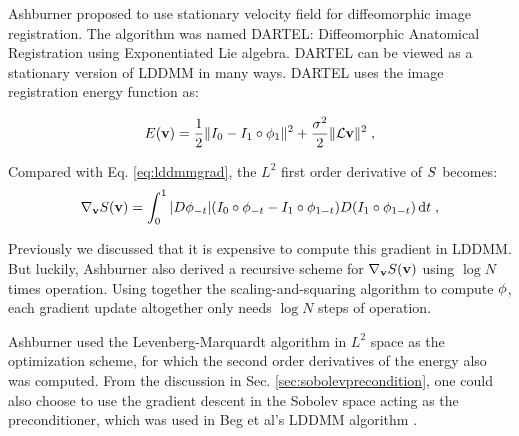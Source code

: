 \documentclass[letterpaper,12pt]{article}
\begin{document}
Ashburner proposed to use stationary velocity field for diffeomorphic image registration. The algorithm was named DARTEL: Diffeomorphic Anatomical Registration using Exponentiated Lie algebra. DARTEL can be viewed as a stationary version of LDDMM in many ways. DARTEL uses the image registration energy  function as:

\begin{align}
E(\mathbf{v}) = \frac{1}{2} \| I_0 - I_1 \circ \phi_{1} \|^2 
+ 
\frac{\sigma^2}{2} \| \mathcal{L} \mathbf{v}\|^2  \;,
\label{eq:dartel}
\end{align}

Compared with Eq. \ref{eq:lddmmgrad}, the $L^2$ first order derivative of $S$ becomes:
\begin{align}
\nabla_{\mathbf{v}} S(\mathbf{v}) = \int_{0}^{1} 
|D\phi_{-t}|
(I_0 \circ \phi_{-t} - I_1 \circ \phi_{1-t})
D(I_1 \circ \phi_{1-t})
\, \text{d} t \; ,
\label{eq:dartelds}
\end{align}

Previously we discussed that it is expensive to compute this gradient in LDDMM. But luckily, Ashburner \cite{Ashburner2007} also derived a recursive scheme for $\nabla_{\mathbf{v}} S(\mathbf{v})$ using $\log N$ times operation. Using together the scaling-and-squaring algorithm to compute $\phi$, each gradient update altogether only needs $\log N$ steps of operation. 

Ashburner used the Levenberg-Marquardt algorithm in $L^2$ space as the optimization scheme, for which the second order derivatives of the energy also was computed. From the discussion in Sec. \ref{sec:sobolevprecondition}, one could also choose to use the gradient descent in the Sobolev space acting as the preconditioner, which was used in Beg et al's LDDMM algorithm \cite{Beg2005Computing}. 
\end{document}
